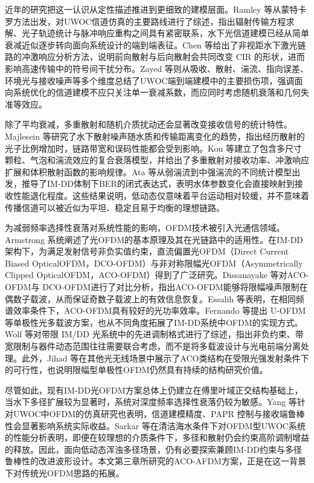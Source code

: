 近年的研究把这一认识从定性描述推进到更细致的建模层面。Ramley 等从蒙特卡罗方法出发，对UWOC信道仿真的主要路线进行了综述，指出辐射传输方程求解、光子轨迹统计与脉冲响应重构之间具有紧密联系，水下光信道建模已经从简单衰减近似逐步转向面向系统设计的端到端表征\cite{ramley2024overview}。Chen 等给出了非视距水下激光链路的冲激响应分析方法，说明前向散射与后向散射会共同改变 CIR 的形状，进而影响高速传输中的符号间干扰分布\cite{chen2022modeling}。Zayed 等则从吸收、散射、湍流、指向误差、环境光与接收噪声等多个维度总结了UWOC端到端建模中的主要损伤项，强调面向系统优化的信道建模不应只关注单一衰减系数，而应同时考虑随机衰落和几何失准等效应\cite{zayed2026comprehensive}。

除了平均衰减，多重散射和随机介质扰动还会显著改变接收信号的统计特性。Majlesein 等研究了水下散射噪声随水质和传输距离变化的趋势，指出经历散射的光子比例增加时，链路带宽和误码性能都会受到影响\cite{majlesein2021investigation}。Kou 等建立了包含多尺寸颗粒、气泡和湍流效应的复合衰落模型，并给出了多重散射对接收功率、冲激响应扩展和体积散射函数的影响规律\cite{kou2023composite, kou2025investigation}。Ata 等从弱湍流到中强湍流的不同统计模型出发，推导了IM-DD体制下BER的闭式表达式，表明水体参数变化会直接映射到接收性能退化程度\cite{ata2023analysis}。这些结果说明，低动态仅意味着平台运动相对较缓，并不意味着传播信道可以被近似为平坦、稳定且易于均衡的理想链路。

为减弱频率选择性衰落对系统性能的影响，OFDM技术被引入光通信领域。Armstrong 系统阐述了光OFDM的基本原理及其在光链路中的适用性\cite{armstrongOFDMOpticalCommunications2009}。在IM-DD架构下，为满足发射信号非负实值约束，直流偏置光OFDM（Direct Current Biased OpticalOFDM，DCO-OFDM）与非对称限幅光OFDM（Asymmetrically Clipped OpticalOFDM，ACO-OFDM）得到了广泛研究。Dissanayake 等对ACO-OFDM与 DCO-OFDM进行了对比分析，指出ACO-OFDM能够将限幅噪声限制在偶数子载波，从而保证奇数子载波上的有效信息恢复\cite{dissanayakeComparisonACOOFDMDCOOFDM2013}。Essalih 等表明，在相同频谱效率条件下，ACO-OFDM具有较好的光功率效率\cite{essalihOpticalOFDMSiPMBased2020}。Fernando 等提出 U-OFDM等单极性光多载波方案，也从不同角度拓展了IM-DD系统中OFDM的实现方式\cite{fernandoFlipOFDMUnipolarCommunication2011}。Wolf 等对带限 IM/DD 光系统中的先进调制格式进行了综述，指出非负约束、带宽限制与器件动态范围往往需要联合考虑，而不是将多载波设计与光电前端分离处理\cite{wolf2024review}。此外，Jihad 等在其他光无线场景中展示了ACO类结构在受限光强发射条件下的可行性，也说明限幅型单极性OFDM仍然具有持续的结构研究价值\cite{jihad2021twodimensions}。

尽管如此，现有IM-DD光OFDM方案总体上仍建立在傅里叶域正交结构基础上，当水下多径扩展较为显著时，系统对深度频率选择性衰落仍较为敏感。Yang 等针对UWOC中OFDM的仿真研究也表明，信道建模精度、PAPR 控制与接收端鲁棒性会显著影响系统实际收益\cite{yangAdvancementsUnderwaterOptical2024}。Sarkar 等在清洁海水条件下对OFDM型UWOC系统的性能分析表明，即便在较理想的介质条件下，多径和散射仍会约束高阶调制增益的释放\cite{sarkar2025performance}。因此，面向低动态浑浊多径场景，仍有必要探索兼顾IM-DD约束与多径鲁棒性的改进波形设计。本文第三章所研究的ACO-AFDM方案，正是在这一背景下对传统光OFDM思路的拓展。

